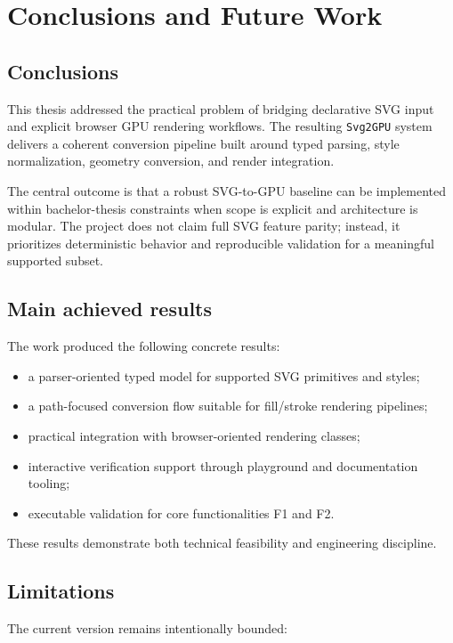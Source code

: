 \chapter{Conclusions and Future Work}
\label{conclusions}

\section{Conclusions}

This thesis addressed the practical problem of bridging declarative SVG input and explicit browser GPU rendering workflows.
The resulting \texttt{Svg2GPU} system delivers a coherent conversion pipeline built around typed parsing, style normalization, geometry conversion, and render integration.

The central outcome is that a robust SVG-to-GPU baseline can be implemented within bachelor-thesis constraints when scope is explicit and architecture is modular.
The project does not claim full SVG feature parity; instead, it prioritizes deterministic behavior and reproducible validation for a meaningful supported subset.

\section{Main achieved results}

The work produced the following concrete results:

\begin{itemize}
\item a parser-oriented typed model for supported SVG primitives and styles;
\item a path-focused conversion flow suitable for fill/stroke rendering pipelines;
\item practical integration with browser-oriented rendering classes;
\item interactive verification support through playground and documentation tooling;
\item executable validation for core functionalities F1 and F2.
\end{itemize}

These results demonstrate both technical feasibility and engineering discipline.

\section{Limitations}

The current version remains intentionally bounded:

